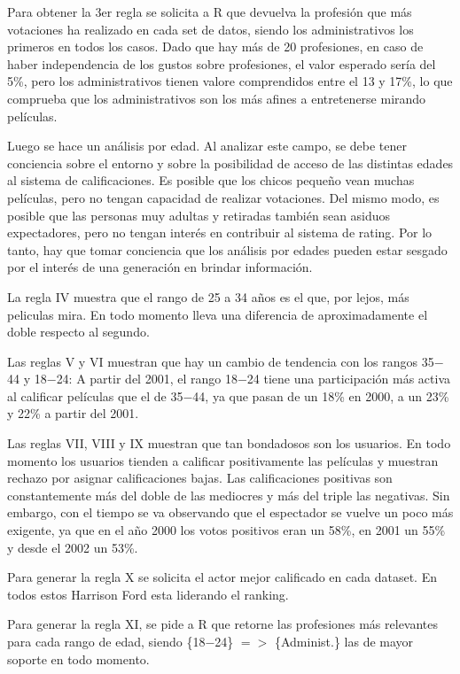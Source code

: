 \documentclass[journal]{IEEEtran}
\begin{document}
Para obtener la 3er regla se solicita a R que devuelva la profesión que más votaciones 
ha realizado en cada set de datos, siendo los administrativos los primeros en todos los casos.
Dado que hay más de 20 profesiones, en caso de haber independencia de los gustos sobre profesiones, 
el valor esperado sería del 5\%, pero los administrativos tienen valore comprendidos entre el
13 y 17\%, lo que comprueba que los administrativos son los más afines a entretenerse mirando
películas.

Luego se hace un análisis por edad. Al analizar este campo, se debe tener conciencia
sobre el entorno y sobre la posibilidad de acceso de las distintas edades al sistema de calificaciones.
Es posible que los chicos pequeño vean muchas películas, pero no tengan capacidad
de realizar votaciones. Del mismo modo, es posible que las personas muy adultas y
retiradas también sean asiduos expectadores, pero no tengan  interés en contribuir al sistema
de rating. Por lo tanto, hay que tomar conciencia que los análisis por edades pueden estar
sesgado por el interés de una generación en brindar información.

 La regla IV muestra
que el rango de 25 a 34 años es el que, por lejos, más peliculas mira. En todo momento
lleva una diferencia de aproximadamente el doble respecto al segundo.

Las reglas V y VI muestran que hay un cambio de tendencia con los rangos 35$-$44 y
18$-$24: A partir del 2001, el rango 18$-$24 tiene una participación más activa
al calificar películas que el de 35$-$44, ya que pasan de un 18\% en 2000, a
un 23\% y 22\% a partir del 2001.

Las reglas VII, VIII y IX muestran que tan bondadosos son los usuarios. En todo
momento los usuarios tienden a calificar positivamente las películas y muestran
rechazo por asignar calificaciones bajas. Las calificaciones positivas son 
constantemente más del doble de las mediocres y más del triple las negativas.
Sin  embargo, con el tiempo se va observando que el espectador se vuelve un
poco más exigente, ya que en el año 2000 los votos positivos eran un 58\%, en
2001 un 55\% y desde el 2002 un 53\%.

Para generar la regla X se solicita el actor mejor calificado en cada dataset.
En todos estos Harrison Ford esta liderando el ranking. 

Para generar la regla XI, se pide a R que retorne las profesiones más relevantes
para cada rango de edad, siendo \{18$-$24\} $=$$>$ \{Administ.\} las de 
mayor soporte en todo momento.
\end{document}
